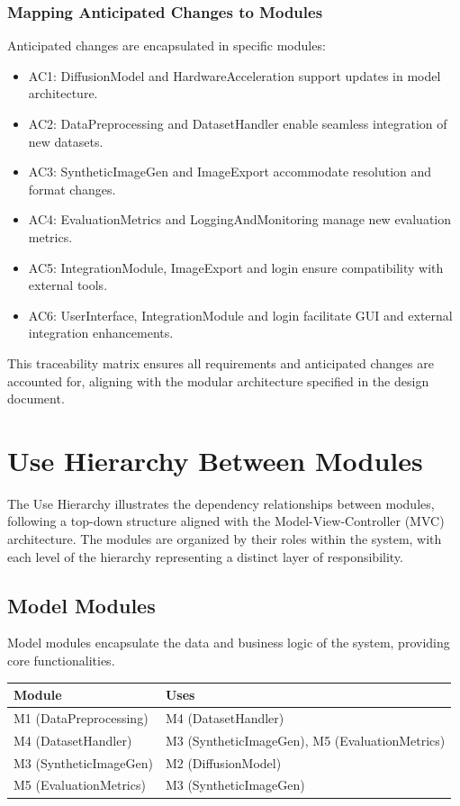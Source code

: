 \documentclass[12pt, titlepage]{article}
\begin{document}
\subsubsection{Mapping Anticipated Changes to Modules}
Anticipated changes are encapsulated in specific modules:
\begin{itemize}
\item AC1: DiffusionModel and HardwareAcceleration support updates in model architecture.
\item AC2: DataPreprocessing and DatasetHandler enable seamless integration of new datasets.
\item AC3: SyntheticImageGen and ImageExport accommodate resolution and format changes.
\item AC4: EvaluationMetrics and LoggingAndMonitoring manage new evaluation metrics.
\item AC5: IntegrationModule, ImageExport and login ensure compatibility with external tools.
\item AC6: UserInterface, IntegrationModule and login facilitate GUI and external integration enhancements.
\end{itemize}

This traceability matrix ensures all requirements and anticipated changes are accounted for, aligning with the modular architecture specified in the design document.

\section{Use Hierarchy Between Modules} \label{SecUse}

The Use Hierarchy illustrates the dependency relationships between modules, following a top-down structure aligned with the Model-View-Controller (MVC) architecture. The modules are organized by their roles within the system, with each level of the hierarchy representing a distinct layer of responsibility.

\subsection{Model Modules}
Model modules encapsulate the data and business logic of the system, providing core functionalities.

\begin{table}[H]
  \begin{tabular}{l|l}
  \textbf{Module} & \textbf{Uses} \\
  \hline
  M1 (DataPreprocessing) & M4 (DatasetHandler)  \\
  M4 (DatasetHandler) & M3 (SyntheticImageGen), M5 (EvaluationMetrics) \\
  M3 (SyntheticImageGen) & M2 (DiffusionModel)  \\
  M5 (EvaluationMetrics) & M3 (SyntheticImageGen) 
  \end{tabular}
\end{table}
\end{document}
